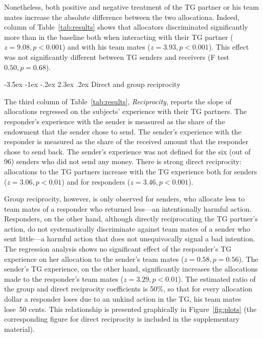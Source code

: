 \documentclass[12pt,a4paper]{article}\usepackage[]{graphicx}\usepackage[]{color}
\makeatletter
\renewcommand\subsection{\@startsection {subsection}{1}{\z@}%
{-3.5ex \@plus -1ex \@minus -.2ex}%
{2.3ex \@plus.2ex}%
{\it\large}}
\makeatother
\begin{document}
Nonetheless, both positive and negative treatment of the TG partner or his team mates increase the absolute difference between the two allocationa. Indeed,
column of Table~\ref{tab:results} shows that allocators discriminated significantly more
than in the baseline both when interacting with their TG partner
($z=9.08,p< 0.001$) and with his team mates 
($z=3.93,p< 0.001$). This effect was not
significantly different between TG senders and receivers (F test $0.50,
p= 0.68$).

\subsection{Direct and group reciprocity}
\label{sec:reciprocity}

The third column of Table~\ref{tab:results}, \emph{Reciprocity}, reports the slope of
allocations regressed on the subjects' experience with their TG partners. 
The responder's experience with the sender is measured
as the share of the endowment that the sender chose to send. The sender's experience with the responder is measured as the share
of the received amount that the responder chose to send back. 
The sender's experience was not defined
for the six (out of 96) senders who did not send any money.
%
There is strong direct reciprocity: allocations
to the TG partners increase with the TG experience both for
senders ($z=3.06,p< 0.01$) and for responders 
($z=3.46,p< 0.001$).

Group reciprocity, however, is only observed for senders, who allocate
less to team mates of a responder who returned less---an intentionally harmful action.
Responders, on the other hand, although directly reciprocating the
TG partner's action, do not systematically discriminate against team mates
of a sender who sent little---a harmful action that does not unequivocally
signal a bad intention. The regression analysis shows no significant
effect of the responder's TG experience on her allocation to the sender's
team mates ($z=0.58,p= 0.56$). 
The sender's TG experience, on the other
hand, significantly increases the allocations made to the responder's team mates 
($z=3.29,p< 0.01$).
The estimated ratio of the group and direct reciprocity coefficients
is 50\%, so that for every allocation dollar a responder
loses due to an unkind action in the TG, his team mates lose~50 cents. 
This relationship is presented graphically in Figure~\ref{fig:plots} (the corresponding figure for direct reciprocity is included in the supplementary material).
\end{document}
